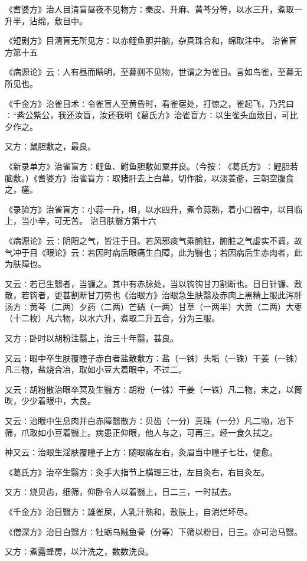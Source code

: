 \documentclass[a4paper,12pt,UTF8,twoside]{ctexbook}
\begin{document}
《耆婆方》治人目清盲昼夜不见物方∶秦皮、升麻、黄芩分等，以水三升，煮取一升半，沾绵，敷目中。

《短剧方》目清盲无所见方∶以赤鲤鱼胆并脑，杂真珠合和，绵取注中。
治雀盲方第十五

《病源论》云∶人有昼而睛明，至暮则不见物，世谓之为雀目。言如鸟雀，至暮无所见也。

《千金方》治雀目术∶令雀盲人至黄昏时，看雀宿处，打惊之，雀起飞，乃咒曰∶“紫公紫公，我还汝盲，汝还我明《葛氏方》治雀盲方∶以生雀头血敷目，可比夕作之。

又方∶鼠胆敷之，最良。

《新录单方》治雀盲方∶鲤鱼、鲋鱼胆敷如粟并良。（今按∶《葛氏方》∶鲤胆若脑敷。）《耆婆方》治雀盲方∶取猪肝去上白幕，切作脍，以淡姜齑，三朝空腹食之，瘥。

《录验方》治雀盲方∶小蒜一升，咀，以水四升，煮令蒜熟，着小口器中，以目临上，当小辛，可无苦。
治目肤翳方第十六

《病源论》云∶阴阳之气，皆注于目。若风邪痰气乘腑脏，腑脏之气虚实不调，故气冲于目《眼论》云∶若因时病后眼痛生白障，此为翳也；若因病后生赤肉者，此为肤障也。

又云∶若已生翳者，当镰之。其中有赤脉处，当以钩钩甘刀割断也。日日针镰、敷散，若钩者，更甚割断甘刀势也《治眼方》治眼急生肤翳及赤肉上黑精上服此泻肝汤方∶黄芩（二两）夕药（二两）芒硝（一两）甘草（一两半）大黄（二两）大枣（十二枚）凡六物，以水六升，煮取二升五合，分为三服。

又方∶卧时以胡粉注翳上，治三十年翳，甚良。

又云∶眼中卒生肤覆瞳子赤白者盐散敷方∶盐（一铢）头垢（一铢）干姜（一铢）凡三物，盐烧合冶，取如小豆大着眼中，不过二。

又云∶胡粉散治眼卒冥及生翳方∶胡粉（一铢）干姜（一铢）凡二物，末之，以筒吹，少少着眼中，大良。

又云∶治眼中生息肉并白赤障翳散方∶贝齿（一分）真珠（一分）凡二物，冶下筛，爪取如小豆着翳上。病患正仰眼，他人与之，可再三。经一食久拭之。

神又云∶治眼生淫肤覆瞳子上方∶随眼痛左右，灸眉当中瞳子七壮，便愈。

《葛氏方》治卒生翳方∶灸手大指节上横理三壮，左目灸右，右目灸左。

又方∶烧贝齿，细筛，仰卧令人以着翳上，日二三，一时拭去。

《千金方》治目翳方∶雄雀屎，人乳汁熟和，敷肤上，自消烂坏尽。

《僧深方》治目白翳方∶牡蛎乌贼鱼骨（分等）下筛以粉目，日三。亦可治马翳。

又方∶煮露蜂房，以汁洗之，数数洗良。
\end{document}
